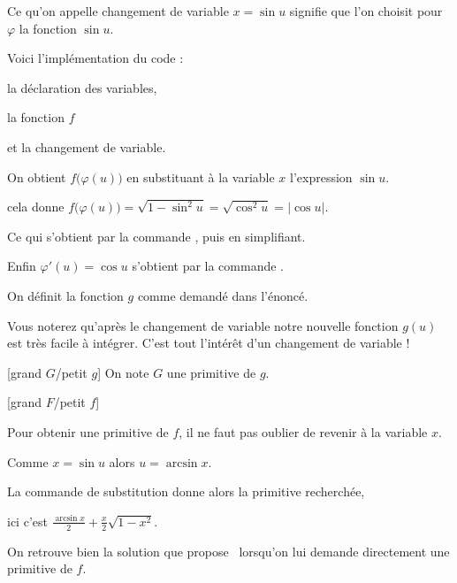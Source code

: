 Ce qu'on appelle changement de variable $x = \sin u$ signifie que l'on choisit pour $\varphi$ la fonction $\sin u$.

Voici l'implémentation du code :

la déclaration des variables,

la fonction $f$

et la changement de variable.


\change
    
On obtient $f\big( \varphi(u) \big)$ en substituant à la variable $x$ l'expression $\sin u$. 
    
    
cela donne $f\big( \varphi(u) \big) = \sqrt{1-\sin^2 u} = \sqrt{\cos^2 u} = |\cos u|$.

Ce qui s'obtient par la commande , puis en simplifiant.    

 
Enfin $\varphi'(u) = \cos u$ s'obtient par la commande .
    
\change


On définit la fonction $g$ comme demandé dans l'énoncé.
	
Vous noterez qu'après le changement de variable notre nouvelle fonction $g(u)$
est très facile à intégrer. C'est tout l'intérêt d'un changement de variable !

[grand $G$/petit $g$] On note $G$ une primitive de $g$.

\change

[grand $F$/petit $f$]

Pour obtenir une primitive de $f$, il ne faut pas oublier de revenir à la variable $x$.

Comme $x = \sin u$ alors $u = \arcsin x$.

La commande de substitution  donne alors la primitive recherchée, 

ici c'est $\frac{\arcsin x}{2} + \frac x2 \sqrt{1-x^2}$.

On retrouve bien la solution que propose \Sage\ lorsqu'on lui demande directement une primitive de $f$. 


